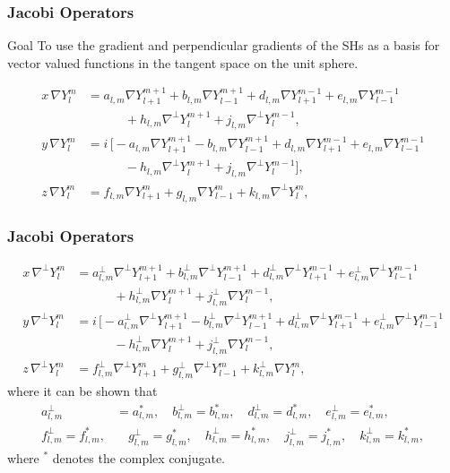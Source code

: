 \documentclass[10pt]{beamer}
\newcommand{\gradY}{\nabla Y}
\newcommand{\gradYlm}{\nabla Y^m_l}
\newcommand{\gradpY}{\nabla^\perp Y}
\newcommand{\gradpYlm}{\nabla^\perp Y^m_l}
\newcommand{\alm}{a_{l,m}}
\newcommand{\blm}{b_{l,m}}
\newcommand{\dlm}{d_{l,m}}
\newcommand{\elm}{e_{l,m}}
\newcommand{\flm}{f_{l,m}}
\newcommand{\glm}{g_{l,m}}
\newcommand{\hlm}{h_{l,m}}
\newcommand{\jlm}{j_{l,m}}
\newcommand{\klm}{k_{l,m}}
\newcommand{\almperp}{a_{l,m}^\perp}
\newcommand{\blmperp}{b_{l,m}^\perp}
\newcommand{\dlmperp}{d_{l,m}^\perp}
\newcommand{\elmperp}{e_{l,m}^\perp}
\newcommand{\flmperp}{f_{l,m}^\perp}
\newcommand{\glmperp}{g_{l,m}^\perp}
\newcommand{\hlmperp}{h_{l,m}^\perp}
\newcommand{\jlmperp}{j_{l,m}^\perp}
\newcommand{\klmperp}{k_{l,m}^\perp}
\begin{document}
\frame
{
    \frametitle{Jacobi Operators}
    
\begin{block}{Goal}
To use the gradient and perpendicular gradients of the SHs as a basis for vector valued functions in the tangent space on the unit sphere.
\end{block}

\begin{align}
x \,\gradYlm &= \alm \gradY^{m+1}_{l+1} + \blm \gradY^{m+1}_{l-1} + \dlm \gradY^{m-1}_{l+1} + \elm \gradY^{m-1}_{l-1} \nonumber \\
& \quad \quad \quad + \hlm \gradpY^{m+1}_{l} + \jlm \gradpY^{m-1}_{l}, \\
y \,\gradYlm &= i \, \Big[ -\alm \gradY^{m+1}_{l+1} - \blm \gradY^{m+1}_{l-1} + \dlm \gradY^{m-1}_{l+1} + \elm \gradY^{m-1}_{l-1} \nonumber \\
& \quad \quad \quad - \hlm \gradpY^{m+1}_{l} + \jlm \gradpY^{m-1}_{l} \Big], \\
z \,\gradYlm &= \flm \gradY^{m}_{l+1} + \glm \gradY^{m}_{l-1} + \klm \gradpY^{m}_{l},
\end{align}
    
}

\frame
{
    \frametitle{Jacobi Operators}

\begin{align}
x \,\gradpYlm &= \almperp \gradpY^{m+1}_{l+1} + \blmperp \gradpY^{m+1}_{l-1} + \dlmperp \gradpY^{m-1}_{l+1} + \elmperp \gradpY^{m-1}_{l-1} \nonumber \\
& \quad \quad \quad + \hlmperp \gradY^{m+1}_{l} + \jlmperp \gradY^{m-1}_{l}, \\
y \,\gradpYlm &= i \, \Big[ -\almperp \gradpY^{m+1}_{l+1} - \blmperp \gradpY^{m+1}_{l-1} + \dlmperp \gradpY^{m-1}_{l+1} + \elmperp \gradpY^{m-1}_{l-1} \nonumber \\
& \quad \quad \quad - \hlmperp \gradY^{m+1}_{l} + \jlmperp \gradY^{m-1}_{l}, \\
z \,\gradpYlm &= \flmperp \gradpY^{m}_{l+1} + \glmperp \gradpY^{m}_{l-1} + \klmperp \gradY^{m}_{l},
\end{align}
where it can be shown that
\begin{align}
\almperp &= \alm^*, \quad \blmperp = \blm^*, \quad \dlmperp = \dlm^*, \quad \elmperp = \elm^*, \nonumber \\
\flmperp = \flm^*,& \quad \glmperp = \glm^*, \quad \hlmperp = \hlm^*, \quad \jlmperp = \jlm^*, \quad \klmperp = \klm^*,
\end{align}
where \(^*\) denotes the complex conjugate.

}
\end{document}
